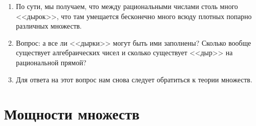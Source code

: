 \begin{enumerate}
\item По сути, мы получаем, что между рациональными числами столь много <<дырок>>, что там умещается бесконечно много всюду плотных попарно различных множеств.
\item Вопрос: а все ли <<дырки>> могут быть ими заполнены? Сколько вообще существует алгебраических чисел и сколько существует <<дыр>> на рациональной прямой?
\item Для ответа на этот вопрос нам снова следует обратиться к теории множеств.
\end{enumerate}

\section{Мощности множеств}\label{powers}



